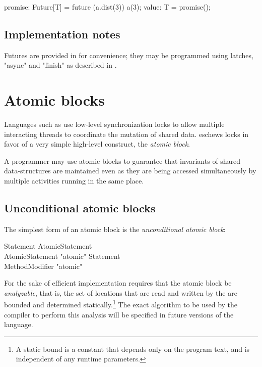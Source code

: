 \begin{example}
\begin{xten}
promise: Future[T] = future (a.dist(3)) a(3);
value: T = promise();
\end{xten}
\end{example}

\subsection{Implementation notes}
Futures are provided in \Xten{} for convenience; they may be
programmed using latches, \xcd"async" and \xcd"finish" as
described in .

\section{Atomic blocks}\label{AtomicBlocks}
Languages such as \java{} use low-level synchronization locks to allow
multiple interacting threads to coordinate the mutation of shared
data. \Xten{} eschews locks in favor of a very simple high-level
construct, the {\em atomic block}.

A programmer may use atomic blocks to guarantee that invariants of
shared data-structures are maintained even as they are being accessed
simultaneously by multiple activities running in the same place.

\subsection{Unconditional atomic blocks}
The simplest form of an atomic block is the {\em unconditional
atomic block}:

\begin{grammar}
Statement \: AtomicStatement \\
AtomicStatement \: \xcd"atomic"  Statement \\
MethodModifier \: \xcd"atomic" \\
\end{grammar}

For the sake of efficient implementation \XtenCurrVer{} requires
that the atomic block be {\em analyzable}, that is, the set of
locations that are read and written by the  are
bounded and determined statically.\footnote{A static bound is a constant
that depends only on the program text, and is independent 
of any runtime parameters. }
The exact algorithm to be used by
the compiler to perform this analysis will be specified in future
versions of the language.
\tbd{}

